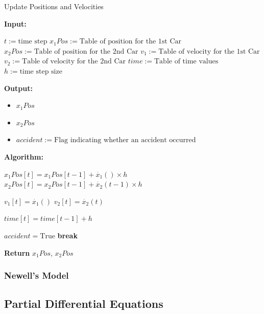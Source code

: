 \documentclass{article}
\begin{document}
			\begin{algorithm}[H]
				\caption{Update Positions and Velocities}\label{alg:update_positions}
				\begin{algorithmic}
					\State \textbf{Input:} \\
					\begin{itemize}
						\State $t:=\text{time step}$
						\State $x_1Pos:=\text{Table of position for the 1st Car}$
						\State $x_2Pos:=\text{Table of position for the 2nd Car}$
						\State $v_1:=\text{Table of velocity for the 1st Car}$
						\State $v_2:=\text{Table of velocity for the 2nd Car}$
						\State $time:=\text{Table of time values}$
						\State $h:=\text{time step size}$
					\end{itemize}
					\State \textbf{Output:} \\
					\begin{itemize}
						\item $x_1Pos$ \\
						\item $x_2Pos$
					\end{itemize}
					\begin{itemize}[]
						\item $accident:=\text{Flag indicating whether an accident occurred}$
					\end{itemize}
					\State \textbf{Algorithm:} \\
					\begin{itemize}[]
						\State $x_1Pos[t] = x_1Pos[t-1] + \dot{x_1}() \times h$
						\State $x_2Pos[t] = x_2Pos[t-1] + \dot{x_2}(t-1) \times h$
						
						\State $v_1[t] = \dot{x_1}()$
						\State $v_2[t] = \dot{x_2}(t)$
						
						\State $time[t] = time[t-1] + h$
						
						\State $accident = \text{True}$
						\State \textbf{break}
						\EndIf
						\EndFor
					\end{itemize}
					\State \textbf{Return} $x_1Pos$, $x_2Pos$
				\end{algorithmic}
			\end{algorithm}
			
			
			
		\subsubsection{Newell's Model}
		\subsection{Partial Differential Equations}
		
\end{document}
